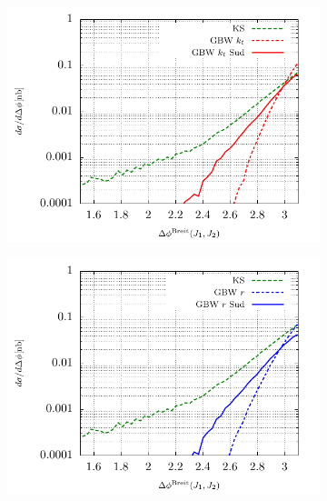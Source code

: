 \documentclass[12pt]{article}
\numberwithin{equation}{section}
\numberwithin{table}{section}
\numberwithin{figure}{section}
\begin{document}
\begin{figure}[p]
	\begin{subfigure}{0.5\textwidth}
		\includegraphics[width=\textwidth]{plots/plotGBW2Jets}
	\end{subfigure}
	\begin{subfigure}{0.5\textwidth}
		\includegraphics[width=\textwidth]{plots/plotGBW3Jets}
	\end{subfigure}


\end{figure}
\end{document}
